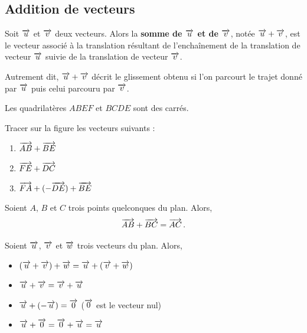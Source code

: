 \documentclass{poly}
\begin{document}
\subsection{Addition de vecteurs}
\begin{definition}
Soit $\overrightarrow{u}$ et $\overrightarrow{v}$ deux vecteurs. Alors la \textbf{somme de $\overrightarrow{u}$ et de $\overrightarrow{v}$}, notée $\overrightarrow{u} + \overrightarrow{v}$, est le vecteur associé à la translation résultant de l'enchaînement de la translation de vecteur $\overrightarrow{u}$ suivie de la translation de vecteur $\overrightarrow{v}$.
\end{definition}
\begin{remark}
Autrement dit, $\overrightarrow{u} + \overrightarrow{v}$ décrit le glissement obtenu si l'on parcourt le trajet donné par $\overrightarrow{u}$ puis celui parcouru par $\overrightarrow{v}$.
\end{remark}
\begin{example}
Les quadrilatères $ABEF$ et $BCDE$ sont des carrés.
\begin{center}
\end{center}
Tracer sur la figure les vecteurs suivants :
\begin{enumerate}[label=\emph{\alph*)}]
\item $\overrightarrow{AB} + \overrightarrow{BE}$
\item $\overrightarrow{FE} + \overrightarrow{DC}$
\item $\overrightarrow{FA} + (- \overrightarrow{DE}) + \overrightarrow{BE}$
\end{enumerate}
\end{example}
\begin{proposition}
Soient $A$, $B$ et $C$ trois points quelconques du plan. Alors,
\begin{equation*}
\overrightarrow{AB} + \overrightarrow{BC} = \overrightarrow{AC}\,.
\end{equation*}
\end{proposition}
\begin{proposition}
Soient $\overrightarrow{u}$, $\overrightarrow{v}$ et $\overrightarrow{w}$ trois vecteurs du plan. Alors,
\begin{itemize}
\item $(\overrightarrow{u} + \overrightarrow{v}) + \overrightarrow{w} = \overrightarrow{u} + (\overrightarrow{v} + \overrightarrow{w})$
\item $\overrightarrow{u} + \overrightarrow{v} = \overrightarrow{v} + \overrightarrow{u}$
\item $\overrightarrow{u} + (- \overrightarrow{u}) = \overrightarrow{0}$ ($\overrightarrow{0}$ est le vecteur nul)
\item $\overrightarrow{u} + \overrightarrow{0} = \overrightarrow{0} + \overrightarrow{u} = \overrightarrow{u}$
\end{itemize}
\end{proposition}
\end{document}
